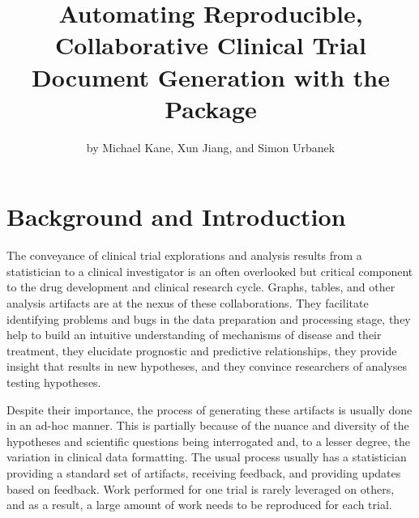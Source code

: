 \title{Automating Reproducible, Collaborative Clinical Trial Document
Generation with the  Package}
\author{by Michael Kane, Xun Jiang, and Simon Urbanek}

\maketitle


\hypertarget{background-and-introduction}{%
\section{Background and
Introduction}\label{background-and-introduction}}

The conveyance of clinical trial explorations and analysis results from
a statistician to a clinical investigator is an often overlooked but
critical component to the drug development and clinical research cycle.
Graphs, tables, and other analysis artifacts are at the nexus of these
collaborations. They facilitate identifying problems and bugs in the
data preparation and processing stage, they help to build an intuitive
understanding of mechanisms of disease and their treatment, they
elucidate prognostic and predictive relationships, they provide insight
that results in new hypotheses, and they convince researchers of
analyses testing hypotheses.

Despite their importance, the process of generating these artifacts is
usually done in an ad-hoc manner. This is partially because of the
nuance and diversity of the hypotheses and scientific questions being
interrogated and, to a lesser degree, the variation in clinical data
formatting. The usual process usually has a statistician providing a
standard set of artifacts, receiving feedback, and providing updates
based on feedback. Work performed for one trial is rarely leveraged on
others, and as a result, a large amount of work needs to be reproduced
for each trial.


